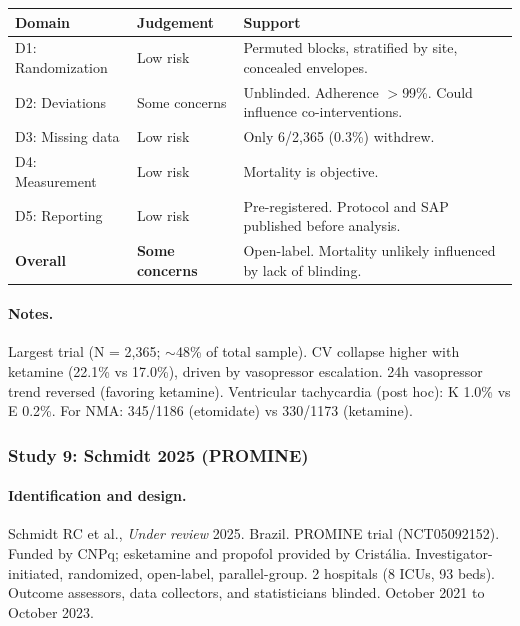 \documentclass[11pt]{article}
\begin{document}
\begin{table}[H]
\centering\footnotesize
\begin{tabularx}{\textwidth}{L{3cm} C{2cm} X}
\toprule
\textbf{Domain} & \textbf{Judgement} & \textbf{Support} \\
\midrule
D1: Randomization & Low risk & Permuted blocks, stratified by site, concealed envelopes. \\
D2: Deviations & Some concerns & Unblinded. Adherence $>$99\%. Could influence co-interventions. \\
D3: Missing data & Low risk & Only 6/2,365 (0.3\%) withdrew. \\
D4: Measurement & Low risk & Mortality is objective. \\
D5: Reporting & Low risk & Pre-registered. Protocol and SAP published before analysis. \\
\textbf{Overall} & \textbf{Some concerns} & Open-label. Mortality unlikely influenced by lack of blinding. \\
\bottomrule
\end{tabularx}
\end{table}

\paragraph{Notes.}
Largest trial (N = 2,365; $\sim$48\% of total sample). CV collapse higher with ketamine (22.1\% vs 17.0\%), driven by vasopressor escalation. 24h vasopressor trend reversed (favoring ketamine). Ventricular tachycardia (post hoc): K 1.0\% vs E 0.2\%. For NMA: 345/1186 (etomidate) vs 330/1173 (ketamine).

\bigskip

\subsubsection{Study 9: Schmidt 2025 (PROMINE)}

\paragraph{Identification and design.}
Schmidt RC et al., \textit{Under review} 2025. Brazil. PROMINE trial (NCT05092152). Funded by CNPq; esketamine and propofol provided by Crist\'{a}lia. Investigator-initiated, randomized, open-label, parallel-group. 2 hospitals (8 ICUs, 93 beds). Outcome assessors, data collectors, and statisticians blinded. October 2021 to October 2023.
\end{document}
